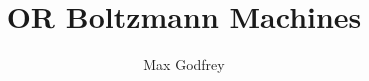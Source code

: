 \documentclass[11pt
              , a4paper
              , twoside
              , openright
              ]{report}
\title{OR Boltzmann Machines}
\author{Max Godfrey}
\date{}
\begin{document}
\frontmatter



\begin{abstract}



\end{abstract}

\maketitle

%


\tableofcontents


\mainmatter




% 
%
% 
%
% 
%
% 

\backmatter



\end{document}
